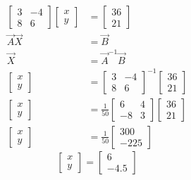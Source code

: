 \documentclass[journal,12pt,twocolumn]{IEEEtran}
\begin{document}
\begin{align*}
\begin{bmatrix}
3 & -4 \\
8 & 6 
\end{bmatrix}
\begin{bmatrix}
x \\ y
\end{bmatrix}
& =
\begin{bmatrix}
36 \\ 21
\end{bmatrix} \\[6pt]
  \vec{A}\vec{X} &=\vec{B} \\[6pt]
  \vec{X} &= \vec{A}^{-1}\vec{B} \\[6pt]
\begin{bmatrix}
x \\ y
\end{bmatrix}
& =
\begin{bmatrix}
3 & -4 \\
8 & 6 
\end{bmatrix}^{-1}
\begin{bmatrix}
36 \\ 21
\end{bmatrix}  \\[6pt]
\begin{bmatrix}
x \\ y
\end{bmatrix}
& =
\frac{1}{50}
\begin{bmatrix}
6 & 4 \\
-8 & 3 
\end{bmatrix}
\begin{bmatrix}
36 \\ 21
\end{bmatrix} \\[6pt]
\begin{bmatrix}
x \\ y
\end{bmatrix}
& =
\frac{1}{50}
\begin{bmatrix}
300 \\ -225
\end{bmatrix}
\end{align*}
\begin{equation}
\begin{bmatrix}
x \\ y
\end{bmatrix}
=
\begin{bmatrix}
6 \\ -4.5
\end{bmatrix}
\end{equation}
\end{document}
